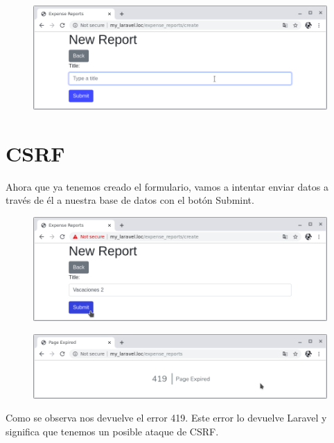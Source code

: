 \documentclass{article}
\begin{document}
\begin{figure}[h!]
  \centering
  \includegraphics[scale=0.5]{./Pictures/058_formulario.png}
\end{figure}



\section{CSRF}%
Ahora que ya tenemos creado el formulario, vamos a intentar enviar datos a
través de él a nuestra base de datos con el botón Submint.\\

\begin{figure}[h!]
  \centering
  \includegraphics[scale=0.5]{./Pictures/059_enviando_form.png}
\end{figure}

\begin{figure}[h!]
  \centering
  \includegraphics[scale=0.5]{./Pictures/060_error_419.png}
\end{figure}

Como se observa nos devuelve el error 419. Este error lo devuelve Laravel y
significa que tenemos un posible ataque de CSRF.\\
\end{document}

